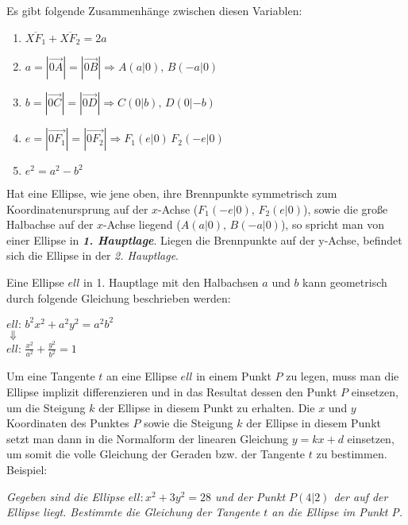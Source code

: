 Es gibt folgende Zusammenh\"{a}nge zwischen diesen Variablen:

\begin{enumerate}
	\item $\overbar{XF_{1}} + \overbar{XF_{2}} = 2a$
	\item $a = |\vec{0A}| = |\vec{0B}| \Rightarrow A (a | 0),\, B (-a | 0)$
	\item $b = |\vec{0C}| = |\vec{0D}| \Rightarrow C (0 | b),\, D (0 | -b)$
	\item $e = |\vec{0F_{1}}| = |\vec{0F_{2}}| \Rightarrow F_{1} (e | 0)\, F_{2} (-e | 0)$
	\item $e^2 = a^2 - b^2$
\end{enumerate}

Hat eine Ellipse, wie jene oben, ihre Brennpunkte symmetrisch zum Koordinatenursprung auf der $x$-Achse ($F_{1} (-e | 0),\, F_{2} (e | 0)$), sowie die gro\ss{}e Halbachse auf der $x$-Achse liegend ($A (a | 0),\, B (-a | 0)$), so spricht man von einer Ellipse in \textbf{\emph{1. Hauptlage}}. Liegen die Brennpunkte auf der y-Achse, befindet sich die Ellipse in der \emph{2. Hauptlage}. 

\pagebreak

Eine Ellipse $ell$ in 1. Hauptlage mit den Halbachsen $a$ und $b$ kann geometrisch durch folgende Gleichung beschrieben werden:

\begin{table}[h!]
	\begin{center}
		$ell:\, b^2x^2 + a^2y^2 = a^2b^2$\\
		$\Downarrow$\\
		$ell:\, \frac{x^2}{a^2} + \frac{y^2}{b^2} = 1$
	\end{center}
\end{table}



Um eine Tangente $t$ an eine Ellipse $ell$ in einem Punkt $P$ zu legen, muss man die Ellipse implizit differenzieren und in das Resultat dessen den Punkt $P$ einsetzen, um die Steigung $k$ der Ellipse in diesem Punkt zu erhalten. Die $x$ und $y$ Koordinaten des Punktes $P$ sowie die Steigung $k$ der Ellipse in diesem Punkt setzt man dann in die Normalform der linearen Gleichung $y = kx + d$ einsetzen, um somit die volle Gleichung der Geraden bzw. der Tangente $t$ zu bestimmen. Beispiel:

\emph{Gegeben sind die Ellipse $ell: x^2 + 3y^2 = 28$ und der Punkt $P(4 | 2)$ der auf der Ellipse liegt. Bestimmte die Gleichung der Tangente $t$ an die Ellipse im Punkt P.}

